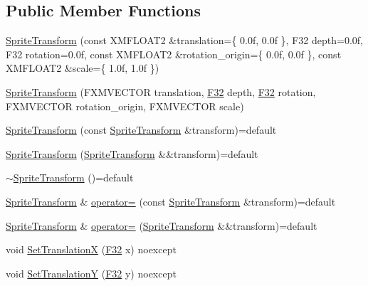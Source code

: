 \subsection*{Public Member Functions}
\begin{DoxyCompactItemize}
\item 
\hyperlink{structmage_1_1_sprite_transform_aeffbb76031558a370d653aaed8c00770}{Sprite\+Transform} (const X\+M\+F\+L\+O\+A\+T2 \&translation=\{ 0.\+0f, 0.\+0f \}, F32 depth=0.\+0f, F32 rotation=0.\+0f, const X\+M\+F\+L\+O\+A\+T2 \&rotation\+\_\+origin=\{ 0.\+0f, 0.\+0f \}, const X\+M\+F\+L\+O\+A\+T2 \&scale=\{ 1.\+0f, 1.\+0f \})
\item 
\hyperlink{structmage_1_1_sprite_transform_a4016fcd8291f51dd3d75f89943b4bf8c}{Sprite\+Transform} (F\+X\+M\+V\+E\+C\+T\+OR translation, \hyperlink{namespacemage_aa97e833b45f06d60a0a9c4fc22ae02c0}{F32} depth, \hyperlink{namespacemage_aa97e833b45f06d60a0a9c4fc22ae02c0}{F32} rotation, F\+X\+M\+V\+E\+C\+T\+OR rotation\+\_\+origin, F\+X\+M\+V\+E\+C\+T\+OR scale)
\item 
\hyperlink{structmage_1_1_sprite_transform_a0126a3f6c7f486f10ec5d5ffd1180698}{Sprite\+Transform} (const \hyperlink{structmage_1_1_sprite_transform}{Sprite\+Transform} \&transform)=default
\item 
\hyperlink{structmage_1_1_sprite_transform_a53d7da4498f4f9f67be2994eb4593c3a}{Sprite\+Transform} (\hyperlink{structmage_1_1_sprite_transform}{Sprite\+Transform} \&\&transform)=default
\item 
\hyperlink{structmage_1_1_sprite_transform_a14a3614023996cbb071c3de99f9528bc}{$\sim$\+Sprite\+Transform} ()=default
\item 
\hyperlink{structmage_1_1_sprite_transform}{Sprite\+Transform} \& \hyperlink{structmage_1_1_sprite_transform_af0adccff92d48e7b347e66277981ee07}{operator=} (const \hyperlink{structmage_1_1_sprite_transform}{Sprite\+Transform} \&transform)=default
\item 
\hyperlink{structmage_1_1_sprite_transform}{Sprite\+Transform} \& \hyperlink{structmage_1_1_sprite_transform_a9278d3fd0a6d346b188515b67a1adfc2}{operator=} (\hyperlink{structmage_1_1_sprite_transform}{Sprite\+Transform} \&\&transform)=default
\item 
void \hyperlink{structmage_1_1_sprite_transform_aa30ede51f36c31b5a35ebe7b60545e1c}{Set\+TranslationX} (\hyperlink{namespacemage_aa97e833b45f06d60a0a9c4fc22ae02c0}{F32} x) noexcept
\item 
void \hyperlink{structmage_1_1_sprite_transform_a3086df30d1ed6813db07bc78ef47df6c}{Set\+TranslationY} (\hyperlink{namespacemage_aa97e833b45f06d60a0a9c4fc22ae02c0}{F32} y) noexcept

\end{DoxyCompactItemize}
